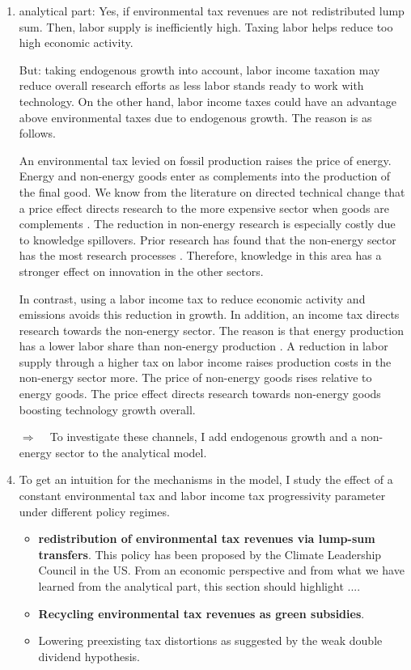 \documentclass[12pt]{article}
\newcommand{\ar}{$\Rightarrow$ \ }
\begin{document}
	\begin{enumerate}
\item analytical part: Yes, if environmental tax revenues are not redistributed lump sum. Then, labor supply is inefficiently high. Taxing labor helps reduce too high economic activity. 

\item[But:]  taking endogenous growth into account, labor income taxation may reduce overall research efforts as less labor stands ready to work with technology.
On the other hand, labor income taxes could have an advantage above environmental taxes due to endogenous growth. 
The reason is as follows.

An environmental tax levied on fossil production raises the price of energy. Energy and non-energy goods enter as complements into the production of the final good. We know from the literature on directed technical change that a price effect  directs research to the more expensive sector when goods are complements \citep{Acemoglu2002DirectedChange, Hemous2021DirectedEconomics}. The reduction in non-energy research is especially costly due to knowledge spillovers. Prior research has found that the non-energy sector has the most research processes \citep{Fried2018ClimateAnalysis}. Therefore, knowledge in this area has a stronger effect on innovation in the other sectors.  

In contrast, using a labor income tax to reduce economic activity and emissions avoids this reduction in growth. In addition, an income tax directs research towards the non-energy sector. The reason is that energy production has a lower labor share than non-energy production \citep{Fried2018ClimateAnalysis}. A reduction in labor supply through a higher tax on labor income raises production costs in the non-energy sector more. The price of non-energy goods rises relative to energy goods. The price effect directs research towards non-energy goods boosting technology growth overall. 

\item[\ar] 
 To investigate these channels, I add endogenous growth and a non-energy sector to the analytical model. 
\item To get an intuition for the mechanisms in the model, I study the effect of a constant environmental tax and labor income tax progressivity parameter under different policy regimes. 
\begin{itemize}
	\item \textbf{redistribution of environmental tax revenues via lump-sum transfers}. This policy has been proposed by the Climate  Leadership  Council  \cite{Baker2017TheDividends} in the US. From an economic perspective and from what we have learned from the analytical part, this section should highlight ....
	\item \textbf{Recycling environmental tax revenues as green subsidies}.
	\item Lowering preexisting tax distortions as suggested by the weak double dividend hypothesis. 
\end{itemize}


\end{enumerate}
\end{document}
